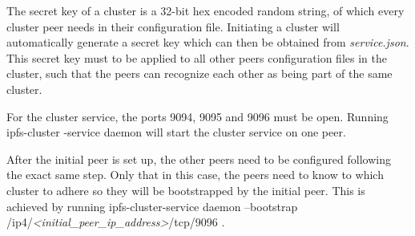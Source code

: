 \documentclass[12pt]{report}
\begin{document}
\begin{appendices}
The secret key of a cluster is a 32-bit hex encoded random string, of which every cluster peer needs in their configuration file. Initiating a cluster will automatically generate a secret key which can then be obtained from \textit{service.json}. This secret key must to be applied to all other peers configuration files in the cluster, such that the peers can recognize each other as being part of the same cluster.

For the cluster service, the ports 9094, 9095 and 9096 must be open. Running  {\ttfamily\small ipfs-cluster}  {\ttfamily\small-service daemon} will start the cluster service on one peer. 

After the initial peer is set up, the other peers need to be configured following the exact same step. Only that in this case, the peers need to know to which cluster to adhere so they will be bootstrapped by the initial peer. This is achieved by running {\ttfamily\small ipfs-cluster-service daemon --bootstrap /ip4/\textit{<initial\_peer\_ip\_address>}/tcp/9096} .
\end{appendices}
\end{document}
